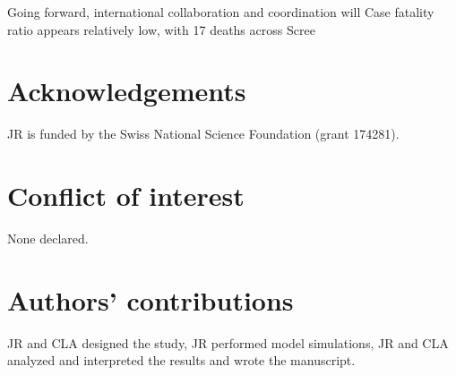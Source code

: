 \documentclass{article}
\begin{document}
Going forward, international collaboration and coordination will
Case fatality ratio appears relatively low, with 17 deaths across
Scree

%
%
%
%
%

\section{Acknowledgements}
JR is funded by the Swiss National Science Foundation (grant 174281).
\section{Conflict of interest}
None declared.

\section{Authors' contributions}

JR and CLA designed the study, JR performed model simulations, JR and CLA analyzed and interpreted the results and wrote the manuscript.


  
\end{document}
